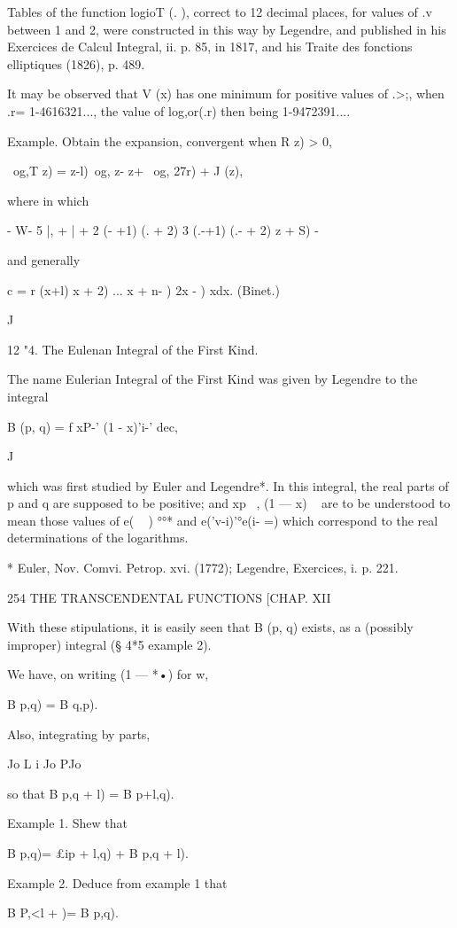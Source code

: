 Tables of the function logioT (. ), correct to 12 decimal places, for
values of .v between 1 and 2, were constructed in this way by
Legendre, and published in his Exercices de Calcul Integral, ii. p.
85, in 1817, and his Traite des fonctions elliptiques (1826), p. 489.

It may be observed that V (x) has one minimum for positive values of
.>;, when .r= 1-4616321..., the value of log,or(.r) then being
1-9472391....

Example. Obtain the expansion, convergent when R z) > 0,

\ og,T z) = z-l)\ og, z- z+ \ og, 27r) + J (z),

where in which

- W- 5 |, + | + 2 (- +1) (. + 2) 3 (.-+1) (.- + 2) z + S) -

and generally

c = r (x+l) x + 2) ... x + n- ) 2x - ) xdx. (Binet.)

J

12 "4. The Eulenan Integral of the First Kind.

The name Eulerian Integral of the First Kind was given by Legendre to
the integral

B (p, q) = f xP-' (1 - x)'i-' dec,

J

which was first studied by Euler and Legendre*. In this integral, the
real parts of p and q are supposed to be positive; and xp~ , (1 — x) ~
are to be understood to mean those values of e( ~ ) °°* and
e('v-i)'°e(i- =) which correspond to the real determinations of the
logarithms.

* Euler, Nov. Comvi. Petrop. xvi. (1772); Legendre, Exercices, i. p.
221.

254 THE TRANSCENDENTAL FUNCTIONS [CHAP. XII

With these stipulations, it is easily seen that B (p, q) exists, as a
(possibly improper) integral (§ 4*5 example 2).

We have, on writing (1 — *•) for w,

B p,q) = B q,p).

Also, integrating by parts,

Jo L i Jo PJo

so that B p,q + l) = B p+l,q).

Example 1. Shew that

B p,q)= £ip + l,q) + B p,q + l).

Example 2. Deduce from example 1 that

B P,<l + )= B p,q).

